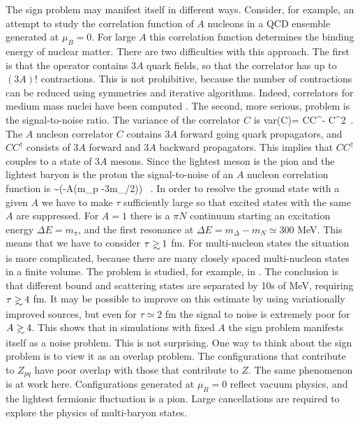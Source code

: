  The sign problem may manifest itself in different ways. Consider,
for example, an attempt to study the correlation function of $A$ 
nucleons in a QCD ensemble generated at $\mu_B=0$. For large $A$ 
this correlation function determines the binding energy of nuclear 
matter. There are two difficulties with this approach. The first is 
that the operator contains $3A$ quark fields, so that the correlator
has up to $(3A)!$ contractions. This is not prohibitive, because
the number of contractions can be reduced using symmetries and 
iterative algorithms. Indeed, correlators for medium mass nuclei 
have been computed \cite{Lin:2014}. The second, more serious, problem
is the signal-to-noise ratio. The variance of the correlator $C$ is 
\be 
 {\rm var}(C)= \langle CC^\dagger \rangle - \langle C\rangle^2\, . 
\ee
The $A$ nucleon correlator $C$ contains $3A$ forward going quark propagators,
and $CC^\dagger$ consists of $3A$ forward and $3A$ backward propagators. This
implies that $CC^\dagger$ couples to a state of $3A$ mesons. Since the lightest
meson is the pion and the lightest baryon is the proton the signal-to-noise
of an $A$ nucleon correlation function is 
\be 
  \sim \exp(-A(m_p -3m_\pi/2)\tau) \, . 
\ee
In order to resolve the ground state with a given $A$ we have to 
make $\tau$ sufficiently large so that excited states with the same
$A$ are suppressed. For $A=1$ there is a $\pi N$ continuum starting 
an excitation energy $\Delta E=m_\pi$, and the first resonance at 
$\Delta E=m_\Delta-m_N\simeq 300$ MeV. This means that we have to 
consider $\tau\gsim 1$ fm. For multi-nucleon states the situation
is more complicated, because there are many closely spaced multi-nucleon
states in a finite volume. The problem is studied, for example, in 
\cite{Beane:2003da}. The conclusion is that different bound and 
scattering states are separated by 10s of MeV, requiring $\tau\gsim
4$ fm. It may be possible to improve on this estimate by using 
variationally improved sources, but even for $\tau\simeq 2$ fm the 
signal to noise is extremely poor for $A\gsim 4$. This shows that in 
simulations with fixed $A$ the sign problem manifests itself as a 
noise problem. This is not surprising. One way to think about the 
sign problem is to view it as an overlap problem. The configurations
that contribute to $Z_{pq}$ have poor overlap with those that contribute
to $Z$. The same phenomenon is at work here. Configurations generated
at $\mu_B=0$ reflect vacuum physics, and the lightest fermionic 
fluctuation is a pion. Large cancellations are required to explore the
physics of multi-baryon states. 


